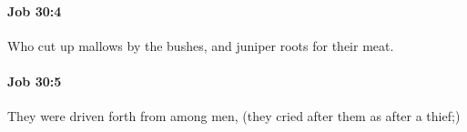 		\paragraph{Job 30:4} %
			\label{JOB-30-4}

			Who cut up mallows by the bushes, and juniper roots for their meat.


		\paragraph{Job 30:5} %
			\label{JOB-30-5}

			They were driven forth from among men, (they cried after them as after a thief;)


